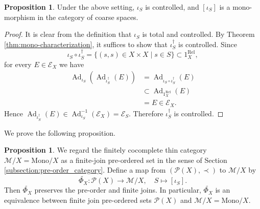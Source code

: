 \documentclass[12pt, a4paper]{amsart}
\theoremstyle{definition}
\newtheorem{proposition}[theorem]{Proposition}
\newcommand{\Ad}{\mathop{\mathrm{Ad}}\nolimits}
\newcommand{\Rel}{\mathrm{Rel}}
\newcommand{\Mono}{\mathrm{Mono}}
\begin{document}
\begin{proposition}\label{proposition:iota_mono}
Under the above setting,
$\iota_S$ is controlled, and
$[\iota_S]$
is a mono-morphism in the category of coarse spaces.
\end{proposition}

\begin{proof}
It is clear from the definition that
$\iota_S$
is total and controlled.
By Theorem \ref{thm:mono-characterization},
it suffices to show that
$\iota_S^\dagger$
is controlled.
Since
\[
\iota_S\circ\iota_S^\dagger
=
\{(s,s)\in X\times X\mid s\in S\}
\subset
1_X^{\Rel},
\]
for every
$E\in\mathcal{E}_X$
we have
\begin{align*}
\Ad_{\iota_S}(\Ad_{\iota_S^\dagger}(E))
    &=
\Ad_{\iota_S\circ\iota_S^\dagger}(E) \\
    &\subset
\Ad_{1_X^{\Rel}}(E) \\
    &=
E
\in
\mathcal{E}_X.
\end{align*}
Hence
$\Ad_{\iota_S^\dagger}(E)
\in
\Ad_{\iota_S}^{-1}(\mathcal{E}_X)
=
\mathcal{E}_S$.
Therefore
$\iota_S^\dagger$
is controlled.
\end{proof}


We prove the following proposition.

\begin{proposition}\label{proposition:Phi_tilde_isom}
We regard the finitely cocomplete thin category $\mathcal{M}/X = \Mono/X$ as a finite-join pre-ordered set in the sense of Section \ref{subsection:pre-order_category}.
Define a map from $(\mathcal{P}(X),\prec)$ to $\mathcal{M}/X$ by
\[
\widetilde{\Phi_X}:\mathcal{P}(X)\rightarrow\mathcal{M}/X,\quad
S\mapsto[\iota_S].
\]
Then $\widetilde{\Phi_X}$ preserves the pre-order and finite joins.
In particular, $\widetilde{\Phi_X}$ is an equivalence between finite join pre-ordered sets $\mathcal{P}(X)$ and $\mathcal{M}/X = \Mono/X$.
\end{proposition}
\end{document}
